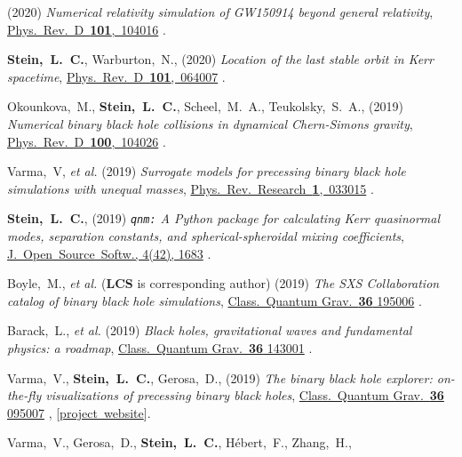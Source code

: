 \begin{etaremune}[start=\value{pubCounter}]
  (2020)
  {\it Numerical relativity simulation of GW150914 beyond general relativity},
  \href{https://doi.org/10.1103/PhysRevD.101.104016}{Phys.~Rev.~D~{\bf 101},~104016}
  .
\item
  {\bf Stein,~L.~C.},
  Warburton,~N.,
  (2020)
  {\it Location of the last stable orbit in Kerr spacetime},
  \href{https://doi.org/10.1103/PhysRevD.101.064007}{Phys.~Rev.~D~{\bf 101},~064007}
  .
\item
  Okounkova,~M.,
  {\bf Stein,~L.~C.},
  Scheel,~M.~A.,
  Teukolsky,~S.~A.,
  (2019)
  {\it Numerical binary black hole collisions in dynamical Chern-Simons gravity},
  \href{https://doi.org/10.1103/PhysRevD.100.104026}{Phys.~Rev.~D~{\bf 100},~104026}
  .
\item
  Varma,~V, {\it et al.}
  (2019)
  {\it Surrogate models for precessing binary black hole simulations with
  unequal masses},
  \href{https://doi.org/10.1103/PhysRevResearch.1.033015}{Phys.~Rev.~Research~{\bf 1},~033015}
  .
\item
  {\bf Stein,~L.~C.},
  (2019)
  \hspace{0.1em}
  {\it {\tt qnm:} A Python package for calculating Kerr quasinormal modes, separation constants, and spherical-spheroidal mixing coefficients},
  \href{https://doi.org/10.21105/joss.01683}{J.~Open~Source~Softw., 4(42), 1683}
  .
\item
  Boyle,~M., {\it et al.} ({\bf LCS} is corresponding author)
  (2019)
  {\it The SXS Collaboration catalog of binary black hole simulations},
  \href{https://doi.org/10.1088/1361-6382/ab34e2}{Class.~Quantum Grav.~{\bf 36} 195006}
  .
\item
  Barack,~L., {\it et al.}
  (2019)
  {\it Black holes, gravitational waves and fundamental physics: a roadmap},
  \href{https://doi.org/10.1088/1361-6382/ab0587}{Class.~Quantum Grav.~{\bf 36} 143001}
  .
\item
  Varma,~V., {\bf Stein,~L.~C.}, Gerosa,~D.,
  (2019)
  {\it The binary black hole explorer: on-the-fly visualizations of precessing binary black holes},
  \href{https://doi.org/10.1088/1361-6382/ab0ee9}{Class.~Quantum Grav.~{\bf 36} 095007}
  ,
  [\href{https://vijayvarma392.github.io/binaryBHexp/}{project~website}].
\item
  Varma,~V., Gerosa,~D., {\bf Stein,~L.~C.}, H\'ebert,~F.,  Zhang,~H.,

\end{etaremune}
